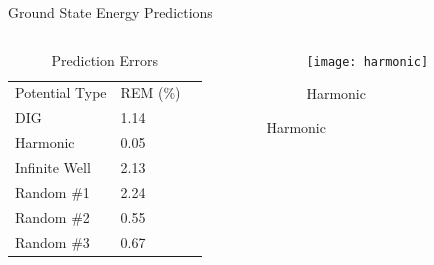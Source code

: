 \documentclass{beamer}
\begin{document}
\begin{frame}{Ground State Energy Predictions}
\begin{columns}
    \begin{column}{0.4\textwidth}
        \begin{table}[]
            \centering
            \caption{Prediction Errors}
            \begin{tabular}{lll}
            Potential Type & REM (\%) \\
            DIG            & 1.14     \\
            Harmonic       & 0.05     \\
            Infinite Well  & 2.13     \\
            Random \#1     & 2.24     \\
            Random \#2     & 0.55     \\
            Random \#3     & 0.67                    
            \end{tabular} 
        \end{table}
    \end{column}
    \begin{column}{0.8\textwidth}
    \graphicspath{{"../figs/training/"}}
    \begin{figure}[H]
        \begin{subfigure}[t]{0.80\textwidth}
            \texttt{[image: harmonic]}
        \caption{Harmonic}
        \end{subfigure}
    \end{figure}
    \end{column}
\end{columns}
\end{frame}
\end{document}
